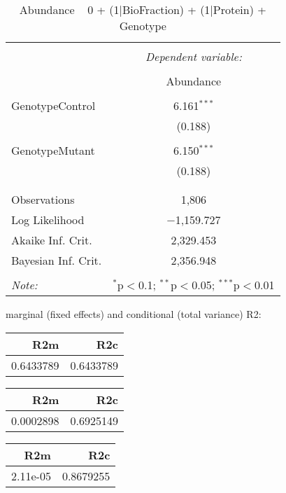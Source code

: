 \documentclass[11pt]{report}
\begin{document}
\begin{table}[!htbp] \centering 
  \caption{Abundance ~ 0 + (1|BioFraction) + (1|Protein) + Genotype} 
  \label{} 
\begin{tabular}{@{\extracolsep{5pt}}lc} 
\\[-1.8ex]\hline 
\hline \\[-1.8ex] 
 & \multicolumn{1}{c}{\textit{Dependent variable:}} \\ 
\cline{2-2} 
\\[-1.8ex] & Abundance \\ 
\hline \\[-1.8ex] 
 GenotypeControl & 6.161$^{***}$ \\ 
  & (0.188) \\ 
  & \\ 
 GenotypeMutant & 6.150$^{***}$ \\ 
  & (0.188) \\ 
  & \\ 
\hline \\[-1.8ex] 
Observations & 1,806 \\ 
Log Likelihood & $-$1,159.727 \\ 
Akaike Inf. Crit. & 2,329.453 \\ 
Bayesian Inf. Crit. & 2,356.948 \\ 
\hline 
\hline \\[-1.8ex] 
\textit{Note:}  & \multicolumn{1}{r}{$^{*}$p$<$0.1; $^{**}$p$<$0.05; $^{***}$p$<$0.01} \\ 
\end{tabular} 
\end{table} 
marginal (fixed effects) and conditional (total variance) R2:

\begin{tabular}{r|r}
\hline
R2m & R2c\\
\hline
0.6433789 & 0.6433789\\
\hline
\end{tabular}

\begin{tabular}{r|r}
\hline
R2m & R2c\\
\hline
0.0002898 & 0.6925149\\
\hline
\end{tabular}

\begin{tabular}{r|r}
\hline
R2m & R2c\\
\hline
2.11e-05 & 0.8679255\\
\hline
\end{tabular}
\end{document}
